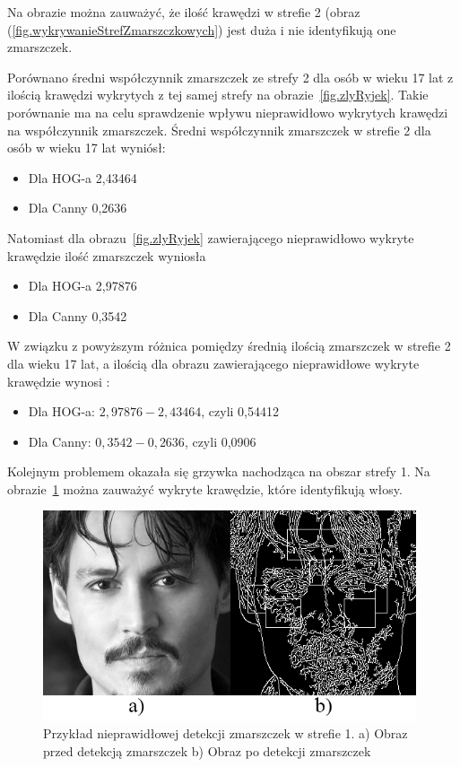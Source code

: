 \documentclass[a4paper,twoside,12pt]{book}
\begin{document}
    Na obrazie można zauważyć, że ilość krawędzi w strefie 2 (obraz (\ref{fig.wykrywanieStrefZmarszczkowych})
    jest duża i nie identyfikują one zmarszczek.

    Porównano średni współczynnik zmarszczek ze strefy 2 dla osób w wieku 17 lat z ilością krawędzi wykrytych z tej
    samej strefy na obrazie~\ref{fig.zlyRyjek}.
    Takie porównanie ma na celu sprawdzenie wpływu nieprawidłowo wykrytych krawędzi na współczynnik zmarszczek.
    \clearpage
    Średni współczynnik zmarszczek w strefie 2 dla osób w wieku 17 lat wyniósł:

    \begin{itemize}
        \item Dla HOG-a 2,43464
        \item Dla Canny 0,2636
    \end{itemize}

    Natomiast dla obrazu~\ref{fig.zlyRyjek} zawierającego nieprawidłowo wykryte krawędzie ilość zmarszczek wyniosła
    \begin{itemize}
        \item Dla HOG-a 2,97876
        \item Dla Canny 0,3542
    \end{itemize}

    W związku z powyższym różnica pomiędzy średnią ilością zmarszczek w strefie 2 dla wieku 17 lat,
    a ilością dla obrazu zawierającego nieprawidłowe wykryte krawędzie wynosi :
    \begin{itemize}
        \item Dla HOG-a: $2,97876 - 2,43464$, czyli 0,54412
        \item Dla Canny: $0,3542 - 0,2636$, czyli 0,0906
    \end{itemize}

    Kolejnym problemem okazała się grzywka nachodząca na obszar strefy 1.
    Na obrazie~\ref{fig.grzywka} można zauważyć wykryte krawędzie,
    które identyfikują włosy.

    \begin{figure}[hb]
        \centering
        \includegraphics[width=11cm]{Obrazy/zlyRyjekZGrzywka.jpg}
        \captionsetup{justification=centering}
        \caption{Przykład nieprawidłowej detekcji zmarszczek w strefie 1. \newline
        a) Obraz przed detekcją zmarszczek b) Obraz po detekcji zmarszczek }
        \label{fig.grzywka}
    \end{figure}
\end{document}
